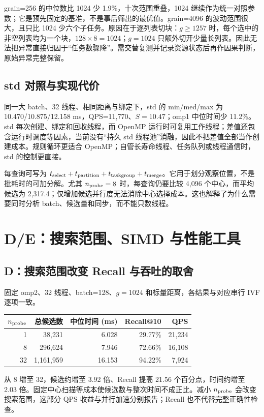 grain=256 的中位数比 1024 少 1.9\%，十次范围重叠，1024 继续作为统一对照参数；它是预先固定的基准，不是事后筛出的最优值。grain=4096 的波动范围很大，且只比 1024 少六个子任务。原因在于逐列表切块：$g\ge1257$ 时，每个选中的非空列表均为一个块，$128\times8=1024$；$g=1024$ 只额外切开少量长列表。因此无法把异常直接归因于“任务数骤降”。需交替复测并记录资源状态后再作因果判断，原始异常完整保留。

\subsection{std 对照与实现代价}
同一大 batch、32 线程、相同距离与绑定下，std 的 min/med/max 为 10.470/10.875/12.158 ms，QPS=11,770、$S=10.47$；omp1 中位时间少 11.2\%。std 每次创建、绑定和回收线程，而 OpenMP 运行时可复用工作线程；差值还包含运行时调度等因素，当前没有“持久 std 线程池”消融，因此不把差值全部当作创建成本。规则循环更适合 OpenMP；自管长寿命线程、任务队列或线程通信时，std 的控制更直接。

每查询可写为 $t_{\rm select}+t_{\rm partition}+t_{\rm taskgroup}+t_{\rm merge}$。它用于划分观察位置，不是批耗时的可加分解。尤其 $n_{\rm probe}=8$ 时，每查询仍要比较 4,096 个中心，而平均候选为 2,317.4；仅增加候选并行度无法消除中心选择成本。这也解释了为什么需要同时分析 batch、候选量和同步，而不能只数线程。

\newpage
\section{D/E：搜索范围、SIMD 与性能工具}
\subsection{D：搜索范围改变 Recall 与吞吐的取舍}
固定 omp2、32 线程、batch=128、$g=1024$ 和标量距离，各结果与对应串行 IVF 逐项一致。
\begin{center}
\smalltable
\begin{tabular}{rrrrr}
\toprule
$n_{\rm probe}$&总候选数&中位时间 (ms)&Recall@10&QPS\\
\midrule
1&38,231&6.028&29.77\%&21,234\\
8&296,624&7.946&72.66\%&16,108\\
32&1,161,959&16.153&94.22\%&7,924\\
\bottomrule
\end{tabular}
\end{center}
从 8 增至 32，候选约增至 3.92 倍、Recall 提高 21.56 个百分点，时间约增至 2.03 倍。固定中心扫描等成本使候选数与整次时间不成正比。减小 $n_{\rm probe}$ 会改变搜索范围，这部分 QPS 收益与并行加速分别报告；Recall 也不代替完整正确性检查。

